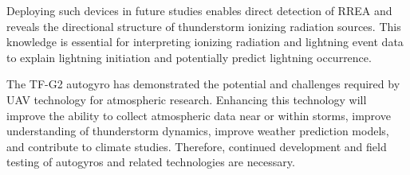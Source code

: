 Deploying such devices in future studies enables direct detection of RREA and reveals the directional structure of thunderstorm ionizing radiation sources. This knowledge is essential for interpreting ionizing radiation and lightning event data to explain lightning initiation and potentially predict lightning occurrence.

The TF-G2 autogyro has demonstrated the potential and challenges required by UAV technology for atmospheric research. Enhancing this technology will improve the ability to collect atmospheric data near or within storms, improve understanding of thunderstorm dynamics, improve weather prediction models, and contribute to climate studies. Therefore, continued development and field testing of autogyros and related technologies are necessary.
